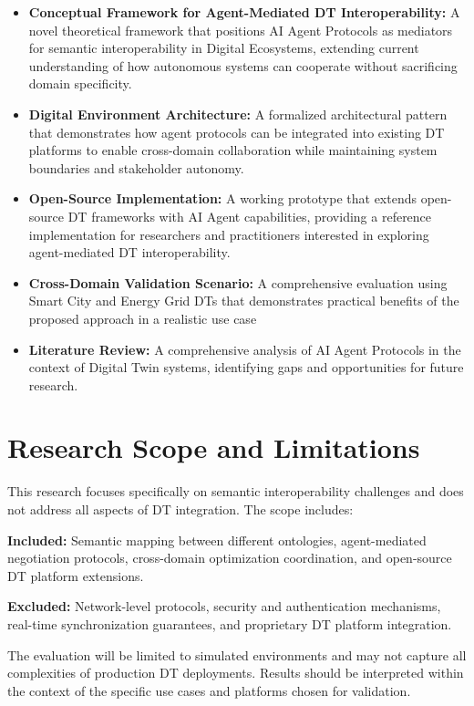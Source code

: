 \begin{itemize}
    \item \textbf{Conceptual Framework for Agent-Mediated DT Interoperability:}
    A novel theoretical framework that positions AI Agent Protocols as mediators for semantic interoperability in Digital Ecosystems,
      extending current understanding of how autonomous systems can cooperate without sacrificing domain specificity.

    \item \textbf{Digital Environment Architecture:}
    A formalized architectural pattern that demonstrates how agent protocols can be integrated into existing DT platforms
      to enable cross-domain collaboration while maintaining system boundaries and stakeholder autonomy.

    \item \textbf{Open-Source Implementation:}
    A working prototype that extends open-source DT frameworks with AI Agent capabilities,
      providing a reference implementation for researchers and practitioners interested in exploring agent-mediated DT interoperability.

    \item \textbf{Cross-Domain Validation Scenario:}
    A comprehensive evaluation using Smart City and Energy Grid DTs that demonstrates practical benefits of the proposed approach in a realistic use case

    \item \textbf{Literature Review:} A comprehensive analysis of AI Agent Protocols in the context of Digital Twin systems,
      identifying gaps and opportunities for future research.
\end{itemize}

\section{Research Scope and Limitations}
\label{sec:scope-limitations}

This research focuses specifically on semantic interoperability challenges and does not address all aspects of DT integration. The scope includes:

\textbf{Included:} 
Semantic mapping between different ontologies,
  agent-mediated negotiation protocols, cross-domain optimization coordination, and
  open-source DT platform extensions.

\textbf{Excluded:}
Network-level protocols,
  security and authentication mechanisms,
  real-time synchronization guarantees, and
  proprietary DT platform integration.

The evaluation will be limited to simulated environments and may not capture all complexities of production DT deployments.
Results should be interpreted within the context of the specific use cases and platforms chosen for validation.
